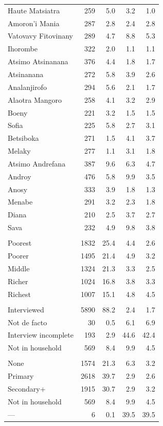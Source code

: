 \begin{longtable}{l|rrrr}
Haute Matsiatra & 259 & 5.0 & 3.2 & 1.0 \\ 
Amoron'i Mania & 287 & 2.8 & 2.4 & 2.8 \\ 
Vatovavy Fitovinany & 289 & 4.7 & 8.8 & 5.3 \\ 
Ihorombe & 322 & 2.0 & 1.1 & 1.1 \\ 
Atsimo Atsinanana & 376 & 4.4 & 1.8 & 1.7 \\ 
Atsinanana & 272 & 5.8 & 3.9 & 2.6 \\ 
Analanjirofo & 294 & 5.6 & 2.1 & 1.7 \\ 
Alaotra Mangoro & 258 & 4.1 & 3.2 & 2.9 \\ 
Boeny & 221 & 3.2 & 1.5 & 1.5 \\ 
Sofia & 225 & 5.8 & 2.7 & 3.1 \\ 
Betsiboka & 271 & 1.5 & 4.1 & 3.7 \\ 
Melaky & 277 & 1.1 & 3.1 & 1.8 \\ 
Atsimo Andrefana & 387 & 9.6 & 6.3 & 4.7 \\ 
Androy & 476 & 5.8 & 9.9 & 3.5 \\ 
Anosy & 333 & 3.9 & 1.8 & 1.3 \\ 
Menabe & 291 & 3.2 & 2.3 & 1.8 \\ 
Diana & 210 & 2.5 & 3.7 & 2.7 \\ 
Sava & 232 & 4.9 & 9.8 & 3.8 \\ 
\midrule\addlinespace[2.5pt]
\multicolumn{5}{l}{Wealth quintile} \\[2.5pt] 
\midrule\addlinespace[2.5pt]
Poorest & 1832 & 25.4 & 4.4 & 2.6 \\ 
Poorer & 1495 & 21.4 & 4.9 & 3.2 \\ 
Middle & 1324 & 21.3 & 3.3 & 2.5 \\ 
Richer & 1024 & 16.8 & 3.8 & 3.3 \\ 
Richest & 1007 & 15.1 & 4.8 & 4.5 \\ 
\midrule\addlinespace[2.5pt]
\multicolumn{5}{l}{Mother's interview status} \\[2.5pt] 
\midrule\addlinespace[2.5pt]
Interviewed & 5890 & 88.2 & 2.4 & 1.7 \\ 
Not de facto & 30 & 0.5 & 6.1 & 6.9 \\ 
Interview incomplete & 193 & 2.9 & 44.6 & 42.4 \\ 
Not in household & 569 & 8.4 & 9.9 & 4.5 \\ 
\midrule\addlinespace[2.5pt]
\multicolumn{5}{l}{Mother's education} \\[2.5pt] 
\midrule\addlinespace[2.5pt]
None & 1574 & 21.3 & 6.3 & 3.2 \\ 
Primary & 2618 & 39.7 & 2.9 & 2.6 \\ 
Secondary+ & 1915 & 30.7 & 2.9 & 3.2 \\ 
Not in household & 569 & 8.4 & 9.9 & 4.5 \\ 
— & 6 & 0.1 & 39.5 & 39.5 \\ 
\bottomrule
\end{longtable}
